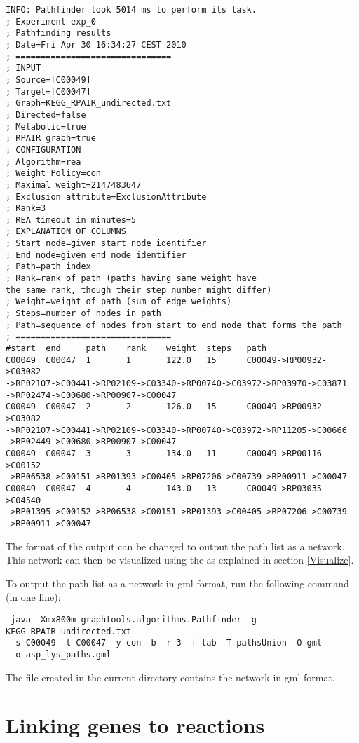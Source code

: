 \begin{lstlisting}
INFO: Pathfinder took 5014 ms to perform its task.
; Experiment exp_0
; Pathfinding results
; Date=Fri Apr 30 16:34:27 CEST 2010
; ===============================
; INPUT
; Source=[C00049]
; Target=[C00047]
; Graph=KEGG_RPAIR_undirected.txt
; Directed=false
; Metabolic=true
; RPAIR graph=true
; CONFIGURATION
; Algorithm=rea
; Weight Policy=con
; Maximal weight=2147483647
; Exclusion attribute=ExclusionAttribute
; Rank=3
; REA timeout in minutes=5
; EXPLANATION OF COLUMNS
; Start node=given start node identifier
; End node=given end node identifier
; Path=path index
; Rank=rank of path (paths having same weight have 
the same rank, though their step number might differ)
; Weight=weight of path (sum of edge weights)
; Steps=number of nodes in path
; Path=sequence of nodes from start to end node that forms the path
; ===============================
#start  end     path    rank    weight  steps   path
C00049  C00047  1       1       122.0   15      C00049->RP00932->C03082
->RP02107->C00441->RP02109->C03340->RP00740->C03972->RP03970->C03871
->RP02474->C00680->RP00907->C00047
C00049  C00047  2       2       126.0   15      C00049->RP00932->C03082
->RP02107->C00441->RP02109->C03340->RP00740->C03972->RP11205->C00666
->RP02449->C00680->RP00907->C00047
C00049  C00047  3       3       134.0   11      C00049->RP00116->C00152
->RP06538->C00151->RP01393->C00405->RP07206->C00739->RP00911->C00047
C00049  C00047  4       4       143.0   13      C00049->RP03035->C04540
->RP01395->C00152->RP06538->C00151->RP01393->C00405->RP07206->C00739
->RP00911->C00047
\end{lstlisting}

The format of the output can be changed to output the path list as a network.
This network can then be visualized using the  as
explained in section \ref{Visualize}.

To output the path list as a network in gml format, run the following command
(in one line):

\begin{verbatim}
 java -Xmx800m graphtools.algorithms.Pathfinder -g KEGG_RPAIR_undirected.txt 
 -s C00049 -t C00047 -y con -b -r 3 -f tab -T pathsUnion -O gml 
 -o asp_lys_paths.gml
\end{verbatim}

The file  created in the current directory contains
the network in gml format.

\section{Linking genes to reactions}

